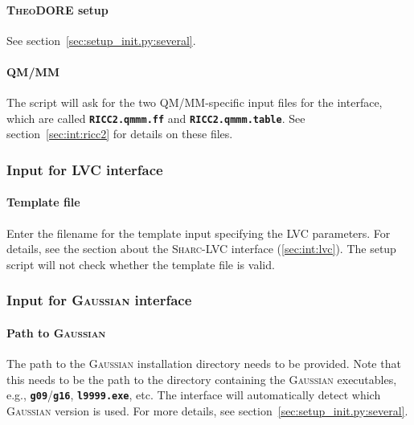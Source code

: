\documentclass[a4paper,10pt,DIV=15,openany]{scrbook}
\newcommand{\sharc}{\textsc{Sharc}}
\newcommand{\ttt}[1]{\textbf{\texttt{#1}}}
\begin{document}
\paragraph{\textsc{TheoDORE} setup}

See section~\ref{sec:setup_init.py:several}.

\paragraph{QM/MM}

The script will ask for the two QM/MM-specific input files for the interface, which are called \ttt{RICC2.qmmm.ff} and \ttt{RICC2.qmmm.table}.
See section~\ref{sec:int:ricc2} for details on these files.


\subsubsection{Input for LVC interface}\label{sec:setup_init.py:lvc}

\paragraph{Template file}

Enter the filename for the template input specifying the LVC parameters. For details, see the section about the \sharc-LVC interface (\ref{sec:int:lvc}). The setup script will not check whether the template file is valid. 


\subsubsection{Input for \textsc{Gaussian} interface}\label{sec:setup_init.py:gaussian}

\paragraph{Path to \textsc{Gaussian}}

The path to the \textsc{Gaussian} installation directory needs to be provided.
Note that this needs to be the path to the directory containing the \textsc{Gaussian} executables, e.g., \ttt{g09}/\ttt{g16}, \ttt{l9999.exe}, etc.
The interface will automatically detect which \textsc{Gaussian} version is used.
For more details, see section~\ref{sec:setup_init.py:several}.
\end{document}
